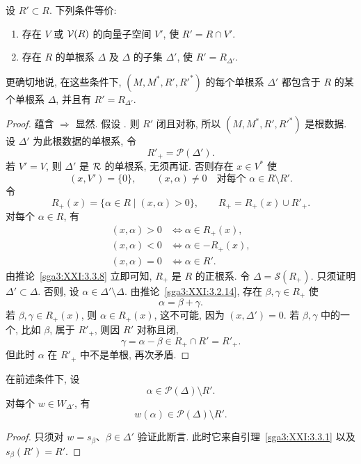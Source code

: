\begin{proposition}\label{sga3:XXI:3.4.8}
设 \(R'\subset R\). 下列条件等价:
\begin{enumerate}
\item[\SGAInlineRefTarget{sga3:XXI:3.4.8:item:i}(i)] 存在 \(V\) 或 \(\mathcal{V}(R)\) 的向量子空间 \(V'\), 使 \(R'=R\cap V'\).
\item[\SGAInlineRefTarget{sga3:XXI:3.4.8:item:ii}(ii)] 存在 \(R\) 的单根系 \(\Delta\) 及 \(\Delta\) 的子集 \(\Delta'\), 使 \(R'=R_{\Delta'}\).
\end{enumerate}
更确切地说, 在这些条件下, \((M,M^\ast,R',R'^\ast)\) 的每个单根系 \(\Delta'\) 都包含于 \(R\) 的某个单根系 \(\Delta\), 并且有 \(R'=R_{\Delta'}\).
\end{proposition}
\begin{proof}
蕴含  \(\Rightarrow\)  显然. 假设 . 则 \(R'\) 闭且对称, 所以 \((M,M^\ast,R',R'^\ast)\) 是根数据. 设 \(\Delta'\) 为此根数据的单根系, 令
\[
 R'_+=\mathscr{P}(\Delta').
\]
若 \(V'=V\), 则 \(\Delta'\) 是 \(\mathcal{R}\) 的单根系, 无须再证. 否则存在 \(x\in V^\ast\) 使
\[
 (x,V')=\{0\},
 \qquad
 (x,\alpha)\ne0
 \quad\text{对每个 }\alpha\in R\setminus R'.
\]
令
\[
 R_+(x)=\{\alpha\in R\mid(x,\alpha)>0\},
 \qquad
 R_+=R_+(x)\cup R'_+.
\]
对每个 \(\alpha\in R\), 有
\[
\begin{aligned}
 (x,\alpha)>0 &\Longleftrightarrow \alpha\in R_+(x),\\
 (x,\alpha)<0 &\Longleftrightarrow \alpha\in-R_+(x),\\
 (x,\alpha)=0 &\Longleftrightarrow \alpha\in R'.
\end{aligned}
\]
由推论~\ref{sga3:XXI:3.3.8} 立即可知, \(R_+\) 是 \(R\) 的正根系. 令 \(\Delta=\mathscr{S}(R_+)\). 只须证明 \(\Delta'\subset\Delta\). 否则, 设 \(\alpha\in\Delta'\setminus\Delta\). 由推论~\ref{sga3:XXI:3.2.14}, 存在 \(\beta,\gamma\in R_+\) 使
\[
 \alpha=\beta+\gamma.
\]
若 \(\beta,\gamma\in R_+(x)\), 则 \(\alpha\in R_+(x)\), 这不可能, 因为 \((x,\Delta')=0\). 若 \(\beta,\gamma\) 中的一个, 比如 \(\beta\), 属于 \(R'_+\), 则因 \(R'\) 对称且闭,
\[
 \gamma=\alpha-\beta\in R_+\cap R'=R'_+.
\]
但此时 \(\alpha\) 在 \(R'_+\) 中不是单根, 再次矛盾.
\end{proof}

\begin{lemma}\label{sga3:XXI:3.4.9}
在前述条件下, 设
\[
 \alpha\in\mathscr{P}(\Delta)\setminus R'.
\]
对每个 \(w\in W_{\Delta'}\), 有
\[
 w(\alpha)\in\mathscr{P}(\Delta)\setminus R'.
\]
\end{lemma}
\begin{proof}
只须对 \(w=s_\beta\)、\(\beta\in\Delta'\) 验证此断言. 此时它来自引理~\ref{sga3:XXI:3.3.1} 以及 \(s_\beta(R')=R'\).
\end{proof}

